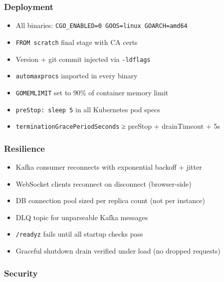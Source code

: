 \documentclass[
]{article}
\providecommand{\tightlist}{%
  \setlength{\itemsep}{0pt}\setlength{\parskip}{0pt}}
\begin{document}
\hypertarget{deployment}{%
\subsubsection{Deployment}\label{deployment}}

\begin{itemize}
\tightlist
\item[$\square$]
  All binaries: \texttt{CGO\_ENABLED=0\ GOOS=linux\ GOARCH=amd64}
\item[$\square$]
  \texttt{FROM\ scratch} final stage with CA certs
\item[$\square$]
  Version + git commit injected via \texttt{-ldflags}
\item[$\square$]
  \texttt{automaxprocs} imported in every binary
\item[$\square$]
  \texttt{GOMEMLIMIT} set to 90\% of container memory limit
\item[$\square$]
  \texttt{preStop:\ sleep\ 5} in all Kubernetes pod specs
\item[$\square$]
  \texttt{terminationGracePeriodSeconds} ≥ preStop + drainTimeout + 5s
\end{itemize}

\hypertarget{resilience}{%
\subsubsection{Resilience}\label{resilience}}

\begin{itemize}
\tightlist
\item[$\square$]
  Kafka consumer reconnects with exponential backoff + jitter
\item[$\square$]
  WebSocket clients reconnect on disconnect (browser-side)
\item[$\square$]
  DB connection pool sized per replica count (not per instance)
\item[$\square$]
  DLQ topic for unparseable Kafka messages
\item[$\square$]
  \texttt{/readyz} fails until all startup checks pass
\item[$\square$]
  Graceful shutdown drain verified under load (no dropped requests)
\end{itemize}

\hypertarget{security}{%
\subsubsection{Security}\label{security}}
\end{document}
